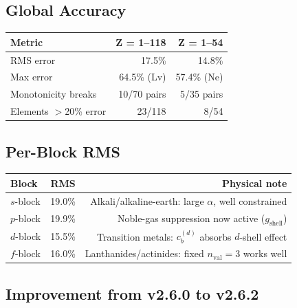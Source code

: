 \documentclass[11pt,letterpaper]{article}
\newcommand{\nval}{n_{\mathrm{val}}}
\newcommand{\cb}{c_b}
\begin{document}
\subsection{Global Accuracy}

\begin{center}
\begin{tabular}{lrr}
\toprule
\textbf{Metric} & \textbf{Z = 1--118} & \textbf{Z = 1--54} \\
\midrule
RMS error              & 17.5\% & 14.8\% \\
Max error              & 64.5\% (Lv) & 57.4\% (Ne) \\
Monotonicity breaks    & 10/70 pairs & 5/35 pairs \\
Elements $>$20\% error & 23/118 & 8/54 \\
\bottomrule
\end{tabular}
\end{center}

\subsection{Per-Block RMS}

\begin{center}
\begin{tabular}{lrr}
\toprule
\textbf{Block} & \textbf{RMS} & \textbf{Physical note} \\
\midrule
$s$-block & 19.0\% & Alkali/alkaline-earth: large $\alpha$, well constrained \\
$p$-block & 19.9\% & Noble-gas suppression now active ($g_{\text{shell}}$) \\
$d$-block & 15.5\% & Transition metals: $\cb^{(d)}$ absorbs $d$-shell effect \\
$f$-block & 16.0\% & Lanthanides/actinides: fixed $\nval=3$ works well \\
\bottomrule
\end{tabular}
\end{center}

\subsection{Improvement from v2.6.0 to v2.6.2}
\end{document}
